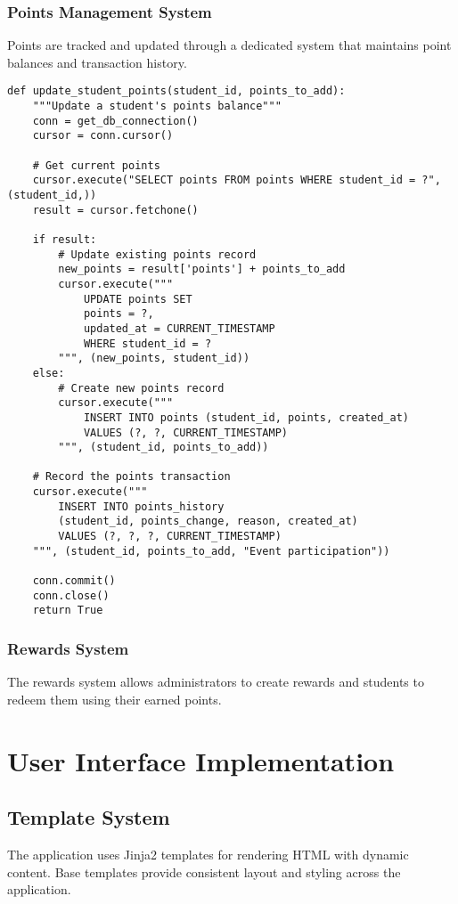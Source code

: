 \documentclass[12pt,a4paper]{report}
\begin{document}
\subsubsection{Points Management System}
Points are tracked and updated through a dedicated system that maintains point balances and transaction history.

\begin{lstlisting}[caption={Points Management Implementation}, label={lst:points}]
def update_student_points(student_id, points_to_add):
    """Update a student's points balance"""
    conn = get_db_connection()
    cursor = conn.cursor()
    
    # Get current points
    cursor.execute("SELECT points FROM points WHERE student_id = ?", (student_id,))
    result = cursor.fetchone()
    
    if result:
        # Update existing points record
        new_points = result['points'] + points_to_add
        cursor.execute("""
            UPDATE points SET 
            points = ?,
            updated_at = CURRENT_TIMESTAMP
            WHERE student_id = ?
        """, (new_points, student_id))
    else:
        # Create new points record
        cursor.execute("""
            INSERT INTO points (student_id, points, created_at)
            VALUES (?, ?, CURRENT_TIMESTAMP)
        """, (student_id, points_to_add))
    
    # Record the points transaction
    cursor.execute("""
        INSERT INTO points_history 
        (student_id, points_change, reason, created_at)
        VALUES (?, ?, ?, CURRENT_TIMESTAMP)
    """, (student_id, points_to_add, "Event participation"))
    
    conn.commit()
    conn.close()
    return True
\end{lstlisting}

\subsubsection{Rewards System}
The rewards system allows administrators to create rewards and students to redeem them using their earned points.

\section{User Interface Implementation}

\subsection{Template System}
The application uses Jinja2 templates for rendering HTML with dynamic content. Base templates provide consistent layout and styling across the application.
\end{document}
